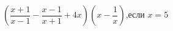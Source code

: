 \begin{ex}
	\begin{condition}
		\( \left( \dfrac{x+1}{x-1}-\dfrac{x-1}{x+1}+4x \right)\left( x-\dfrac{1}{x} \right) \),\hspace{0.5cm}если \( x=5 \)
	\end{condition}
\end{ex}